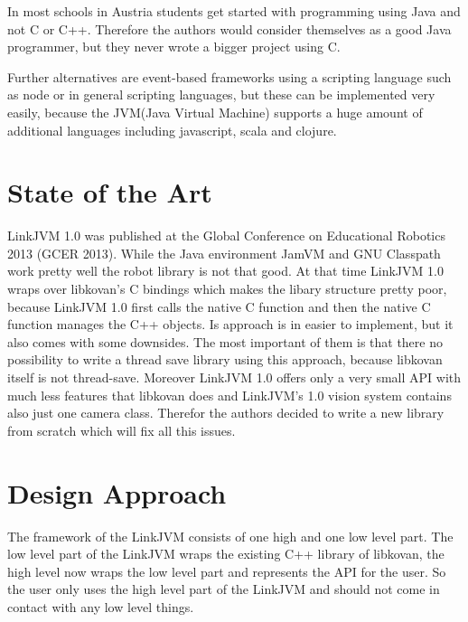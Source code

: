 \documentclass{juniorjournal}
\begin{document}
In most schools in Austria students get started with programming using Java\cite{Java} and not C or C++.
Therefore the authors would consider themselves as a good Java\cite{Java} programmer, 
but they never wrote a bigger project using C.

Further alternatives are event-based frameworks using a scripting language 
such as node\cite{node} or in general scripting languages, but these can be implemented very easily, 
because the JVM\cite{JVM}(Java\cite{Java} Virtual Machine) supports a huge amount of additional languages 
including javascript, scala and clojure.
%

\section{State of the Art}
LinkJVM 1.0\cite{linkjvm1.0} was published at the Global Conference on Educational Robotics 2013 (GCER\cite{GCER} 2013).
While the Java\cite{Java} environment JamVM and GNU Classpath\cite{GNU} work pretty well the robot library is not that good.
At that time LinkJVM 1.0\cite{linkjvm1.0} wraps over libkovan's\cite{libkovan} C bindings which makes the libary structure pretty poor, because LinkJVM 1.0\cite{linkjvm1.0} first calls the native C function and then the native C function manages the C++ objects.
Is approach is in easier to implement, but it also comes with some downsides.
The most important of them is that there no possibility to write a thread save library using this approach, because libkovan\cite{libkovan} itself is not thread-save.
Moreover LinkJVM 1.0\cite{linkjvm1.0} offers only a very small API with much less features that libkovan\cite{libkovan} does and LinkJVM's 1.0\cite{linkjvm1.0} vision system contains also just one camera class.
Therefor the authors decided to write a new library from scratch which will fix all this issues. 

\section{Design Approach}
\label{sec:design-approach}
The framework of the LinkJVM consists of one high and one low level part.
The low level part of the LinkJVM wraps the existing C++ library of libkovan\cite{libkovan}, 
the high level now wraps the low level part and represents the API for the user.
So the user only uses the high level part of the LinkJVM and should not come in 
contact with any low level things.
\end{document}
